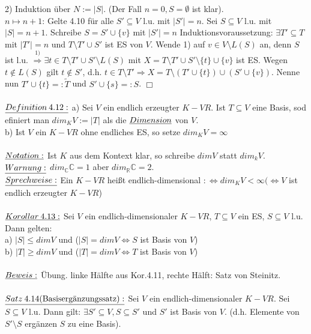 \documentclass[fleqn, a4paper, 11pt]{article}
\begin{document}
2) Induktion \"uber $N:=|S|$. (Der Fall $n=0,S=\emptyset$ ist klar).\\
$n\mapsto n+1$: Gelte 4.10 f\"ur alle $S'\subseteq V$ l.u. mit $|S'|=n$. Sei $S\subseteq V$ l.u. mit $|S|=n+1$. Schreibe $S=S'\cup\{v\}$ mit $|S'|=n$
Induktionsvoraussetzung: $\exists T'\subseteq T$ mit $|T'|=n$ und $T\setminus T'\cup S'$ ist ES von $V$. Wende 1) auf $v\in V\setminus L(S)$ an, denn $S$ ist l.u. $\stackrel{1)}{\Rightarrow}\exists t\in T\setminus T'\cup S'\setminus L(S)$ mit $X=T\setminus T'\cup S'\setminus\{t\}\cup\{v\}$ ist ES. Wegen $t\notin L(S)$ gilt $t\notin S'$, d.h. $t\in T\setminus T'\Rightarrow X=T\setminus (T'\cup\{t\})\cup(S'\cup\{v\})$. Nenne nun $T'\cup \{t\}=:\tilde{T}$ und $S'\cup\{s\}=:S$. \hfill $\Box$\\
\\
$\uline{Definition\:4.12:}$ a) Sei $V$ ein endlich erzeugter $K-VR$. Ist $T\subseteq V$ eine Basis, sod efiniert man $dim_K V:= |T|$ als die $\uline{Dimension}$ von $V$.\\
b) Ist $V$ ein $K-VR$ ohne endliches ES, so setze $dim_K V=\infty$\\
\\
$\uline{Notation:}$ Ist $K$ aus dem Kontext klar, so schreibe $dim V$ statt $dim_k V$.\\
$\uline{Warnung:}$ $dim_{\mathbb{C}} \mathbb{C}=1$ aber $dim_{\mathbb{R}} \mathbb{C}=2$.\\
$\uline{Sprechweise:}$ Ein $K-VR$ hei\ss{}t endlich-dimensional $:\Leftrightarrow dim_K V < \infty (\Leftrightarrow V$ ist endlich erzeugter $K-VR$)\\
\\
$\uline{Korollar\:4.13:}$ Sei $V$ ein endlich-dimensionaler $K-VR$, $T\subseteq V$ ein ES, $S\subseteq V$ l.u. Dann gelten:\\
a) $|S|\leq dim V$ und ($|S|=dim V\Leftrightarrow S$ ist Basis von $V$)\\
b) $|T|\geq dim V$ und ($|T|=dim V\Leftrightarrow T$ ist Basis von $V$)\\
\\
$\uline{Beweis:}$ \"Ubung. linke H\"alfte aus Kor.4.11, rechte H\"alft: Satz von Steinitz.\\
\\
$\uline{Satz\:4.14(\text{Basiserg\"anzungssatz}):}$ Sei $V$ ein endlich-dimensionaler $K-VR$. Sei $S\subseteq V$ l.u. Dann gilt: $\exists S' \subseteq V,S\subseteq S'$ und $S'$ ist Basis von $V$. (d.h. Elemente von $S'\setminus S$ erg\"anzen $S$ zu eine Basis).\\
\end{document}
